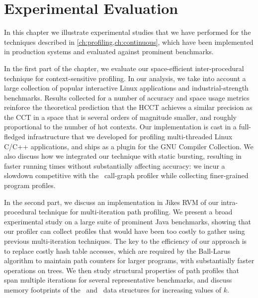 
\chapter{Experimental Evaluation}
\label{ch:experiments}

In this chapter we illustrate experimental studies that we have performed for the techniques described in \mychapter\ref{ch:profiling,ch:continuous}, which have been implemented in production systems and evaluated against prominent benchmarks.  


In the first part of the chapter, we evaluate our space-efficient inter-procedural technique for context-sensitive profiling. In our analysis, we take into account a large collection of popular interactive Linux applications and industrial-strength benchmarks. Results collected for a number of accuracy and space usage metrics reinforce the theoretical prediction that the HCCT achieves a similar precision as the CCT in a space that is several orders of magnitude smaller, and roughly proportional to the number of hot contexts. Our implementation is cast in a full-fledged infrastructure that we developed for profiling multi-threaded Linux C/C++ applications, and ships as a plugin for the GNU Compiler Collection. We also discuss how we integrated our technique with static bursting, resulting in faster running times without substantially affecting accuracy: we incur a slowdown competitive with the \gprof\ call-graph profiler while collecting finer-grained program profiles. 

In the second part, we discuss an implementation in Jikes RVM of our intra-procedural technique for multi-iteration path profiling. We present a broad experimental study on a large suite of prominent Java benchmarks, showing that our profiler can collect profiles that would have been too costly to gather using previous multi-iteration techniques. The key to the efficiency of our approach is to replace costly hash table accesses, which are  required by the Ball-Larus algorithm to maintain path counters for larger programs, with substantially faster operations on trees. We then study structural properties of path profiles that span multiple iterations for several representative benchmarks, and discuss memory footprints of the \ksf\ and \kipf\ data structures for increasing values of $k$.

